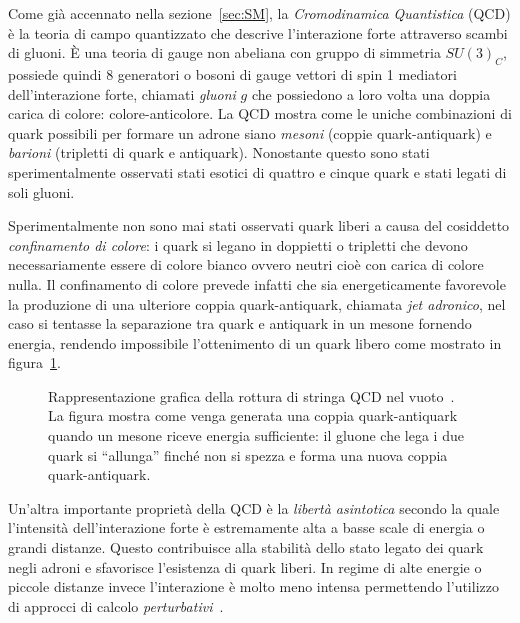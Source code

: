     Come già accennato nella sezione~\ref{sec:SM}, la \textit{Cromodinamica Quantistica} (QCD) è la teoria di campo quantizzato che descrive l'interazione forte attraverso scambi di gluoni. È una teoria di gauge non abeliana con gruppo di simmetria $SU(3)_C$, possiede quindi 8 generatori o bosoni di gauge vettori di spin 1 mediatori dell'interazione forte, chiamati \textit{gluoni} $g$ che possiedono a loro volta una doppia carica di colore: colore-anticolore. La QCD mostra come le uniche combinazioni di quark possibili per formare un adrone siano \textit{mesoni} (coppie quark-antiquark) e \textit{barioni} (tripletti di quark e antiquark). Nonostante questo sono stati sperimentalmente osservati stati esotici di quattro e cinque quark e stati legati di soli gluoni.

    Sperimentalmente non sono mai stati osservati quark liberi a causa del cosiddetto \textit{confinamento di colore}: i quark si legano in doppietti o tripletti che devono necessariamente essere di colore bianco ovvero neutri cioè con carica di colore nulla. Il confinamento di colore prevede infatti che sia energeticamente favorevole la produzione di una ulteriore coppia quark-antiquark, chiamata \textit{jet adronico}, nel caso si tentasse la separazione tra quark e antiquark in un mesone fornendo energia, rendendo impossibile l'ottenimento di un quark libero come mostrato in figura~\ref{fig:2-hadron-jet}.

    \begin{figure}[t]
        \centering
        
        \caption{Rappresentazione grafica della rottura di stringa QCD nel vuoto~\cite{Wikimedia_Quark_Confinement}. La figura mostra come venga generata una coppia quark-antiquark quando un mesone riceve energia sufficiente: il gluone che lega i due quark si ``allunga'' finché non si spezza e forma una nuova coppia quark-antiquark.}
        \label{fig:2-hadron-jet}
    \end{figure}

    Un'altra importante proprietà della QCD è la \textit{libertà asintotica} secondo la quale l'intensità dell'interazione forte è estremamente alta a basse scale di energia o grandi distanze. Questo contribuisce alla stabilità dello stato legato dei quark negli adroni e sfavorisce l'esistenza di quark liberi. In regime di alte energie o piccole distanze invece l'interazione è molto meno intensa permettendo l'utilizzo di approcci di calcolo \textit{perturbativi}~\cite{BGS_2012}.

